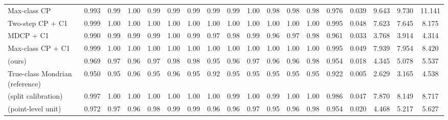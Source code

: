 \begin{table}[!htbp]
{\begin{tabular}{lccccccccccccccccc}
Max-class CP & 0.993 & 0.99 & 1.00 & 0.99 & 0.99 & 0.99 & 0.99 & 0.99 & 1.00 & 0.98 & 0.98 & 0.98 & 0.976 & 0.039 & 9.643 & 9.730 & 11.141 \\
Two-step CP + C1 & 0.999 & 1.00 & 1.00 & 1.00 & 1.00 & 1.00 & 1.00 & 1.00 & 1.00 & 1.00 & 1.00 & 1.00 & 0.995 & 0.048 & 7.623 & 7.645 & 8.175 \\
MDCP + C1 & 0.990 & 0.99 & 0.99 & 0.99 & 1.00 & 0.99 & 0.97 & 0.98 & 0.99 & 0.96 & 0.97 & 0.98 & 0.961 & 0.033 & 3.768 & 3.914 & 4.314 \\
Max-class CP + C1 & 0.999 & 1.00 & 1.00 & 1.00 & 1.00 & 1.00 & 1.00 & 1.00 & 1.00 & 1.00 & 1.00 & 1.00 & 0.995 & 0.049 & 7.939 & 7.954 & 8.420 \\
\gamut{} (ours) & 0.969 & 0.97 & 0.96 & 0.97 & 0.98 & 0.98 & 0.95 & 0.96 & 0.97 & 0.96 & 0.96 & 0.98 & 0.954 & 0.018 & 4.345 & 5.078 & 5.537 \\
True-class Mondrian (reference) & 0.950 & 0.95 & 0.96 & 0.95 & 0.96 & 0.95 & 0.92 & 0.95 & 0.95 & 0.95 & 0.95 & 0.95 & 0.922 & 0.005 & 2.629 & 3.165 & 4.538 \\
\gamut{} (split calibration) & 0.997 & 1.00 & 1.00 & 1.00 & 1.00 & 1.00 & 1.00 & 0.99 & 1.00 & 0.99 & 1.00 & 1.00 & 0.986 & 0.047 & 7.870 & 8.149 & 8.717 \\
\gamut{} (point-level unit) & 0.972 & 0.97 & 0.96 & 0.98 & 0.99 & 0.99 & 0.96 & 0.96 & 0.97 & 0.95 & 0.96 & 0.98 & 0.954 & 0.020 & 4.468 & 5.217 & 5.627 \\
\bottomrule
\end{tabular}}
\end{table}
\FloatBarrier
